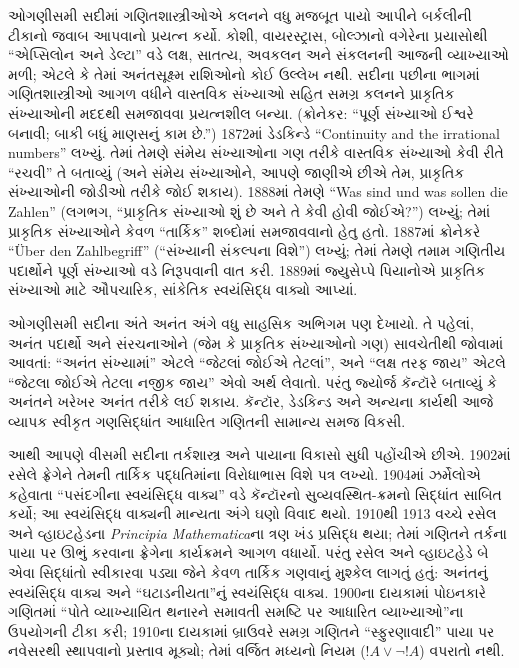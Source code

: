 ઓગણીસમી સદીમાં ગણિતશાસ્ત્રીઓએ કલનને વધુ મજબૂત પાયો
આપીને બર્કલીની ટીકાનો જવાબ આપવાનો પ્રયત્ન કર્યો.
કોશી, વાયરસ્ટ્રાસ, બોલ્ઝાનો વગેરેના પ્રયાસોથી
``એપ્સિલોન અને ડેલ્ટા'' વડે લક્ષ, સાતત્ય,
અવકલન અને સંકલનની આજની વ્યાખ્યાઓ મળી; એટલે કે
તેમાં અનંતસૂક્ષ્મ રાશિઓનો કોઈ ઉલ્લેખ નથી. સદીના
પછીના ભાગમાં ગણિતશાસ્ત્રીઓ આગળ વધીને વાસ્તવિક
સંખ્યાઓ સહિત સમગ્ર કલનને પ્રાકૃતિક સંખ્યાઓની મદદથી
સમજાવવા પ્રયત્નશીલ બન્યા. (ક્રોનેકર: ``પૂર્ણ સંખ્યાઓ
ઈશ્વરે બનાવી; બાકી બધું માણસનું કામ છે.'') 1872માં
ડેડકિન્ડે ``Continuity and the irrational numbers''
લખ્યું. તેમાં તેમણે સંમેય સંખ્યાઓના ગણ તરીકે વાસ્તવિક
સંખ્યાઓ કેવી રીતે ``રચવી'' તે બતાવ્યું (અને સંમેય
સંખ્યાઓને, આપણે જાણીએ છીએ તેમ, પ્રાકૃતિક સંખ્યાઓની
જોડીઓ તરીકે જોઈ શકાય). 1888માં તેમણે ``Was sind und
was sollen die Zahlen'' (લગભગ, ``પ્રાકૃતિક સંખ્યાઓ
શું છે અને તે કેવી હોવી જોઈએ?'') લખ્યું; તેમાં
પ્રાકૃતિક સંખ્યાઓને કેવળ ``તાર્કિક'' શબ્દોમાં સમજાવવાનો
હેતુ હતો. 1887માં ક્રોનેકરે ``\"Uber den Zahlbegriff''
(``સંખ્યાની સંકલ્પના વિશે'') લખ્યું; તેમાં તેમણે તમામ
ગણિતીય પદાર્થોને પૂર્ણ સંખ્યાઓ વડે નિરૂપવાની વાત કરી.
1889માં જ્યુસેપ્પે પિયાનોએ પ્રાકૃતિક સંખ્યાઓ માટે
ઔપચારિક, સાંકેતિક સ્વયંસિદ્ધ વાક્યો આપ્યાં.

ઓગણીસમી સદીના અંતે અનંત અંગે વધુ સાહસિક અભિગમ પણ
દેખાયો. તે પહેલાં, અનંત પદાર્થો અને સંરચનાઓને
(જેમ કે પ્રાકૃતિક સંખ્યાઓનો ગણ) સાવચેતીથી જોવામાં
આવતાં: ``અનંત સંખ્યામાં'' એટલે ``જેટલાં જોઈએ તેટલાં'',
અને ``લક્ષ તરફ જાય'' એટલે ``જેટલા જોઈએ તેટલા નજીક
જાય'' એવો અર્થ લેવાતો. પરંતુ જ્યોર્જ કૅન્ટૉરે બતાવ્યું
કે અનંતને ખરેખર અનંત તરીકે લઈ શકાય. કૅન્ટૉર,
ડેડકિન્ડ અને અન્યના કાર્યથી આજે વ્યાપક સ્વીકૃત
ગણસિદ્ધાંત આધારિત ગણિતની સામાન્ય સમજ વિકસી.

આથી આપણે વીસમી સદીના તર્કશાસ્ત્ર અને પાયાના વિકાસો
સુધી પહોંચીએ છીએ. 1902માં રસેલે ફ્રેગેને તેમની તાર્કિક
પદ્ધતિમાંના વિરોધાભાસ વિશે પત્ર લખ્યો.
1904માં ઝર્મેલોએ
કહેવાતા ``પસંદગીના સ્વયંસિદ્ધ વાક્ય'' વડે કૅન્ટૉરનો
સુવ્યવસ્થિત-ક્રમનો સિદ્ધાંત સાબિત કર્યો; આ સ્વયંસિદ્ધ
વાક્યની માન્યતા અંગે ઘણો વિવાદ થયો. 1910થી 1913
વચ્ચે રસેલ અને વ્હાઇટહેડના \emph{Principia Mathematica}ના
ત્રણ ખંડ પ્રસિદ્ધ થયા; તેમાં ગણિતને તર્કના પાયા પર
ઊભું કરવાના ફ્રેગેના કાર્યક્રમને આગળ વધાર્યો. પરંતુ
રસેલ અને વ્હાઇટહેડે બે એવા સિદ્ધાંતો સ્વીકારવા પડ્યા
જેને કેવળ તાર્કિક ગણવાનું મુશ્કેલ લાગતું હતું:
અનંતનું સ્વયંસિદ્ધ વાક્ય અને ``ઘટાડનીયતા''નું
સ્વયંસિદ્ધ વાક્ય. 1900ના દાયકામાં પોઇનકારે ગણિતમાં
``પોતે વ્યાખ્યાયિત થનારને સમાવતી સમષ્ટિ પર આધારિત
વ્યાખ્યાઓ''ના ઉપયોગની ટીકા કરી;
1910ના દાયકામાં બ્રાઉવરે સમગ્ર ગણિતને ``સ્ફુરણાવાદી''
પાયા પર નવેસરથી સ્થાપવાનો પ્રસ્તાવ મૂક્યો; તેમાં
વર્જિત મધ્યનો નિયમ ($!A \lor \lnot !A$) વપરાતો નથી.

